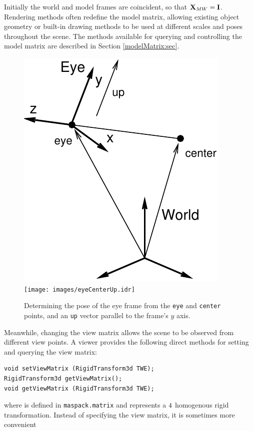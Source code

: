 Initially the world and model frames are coincident, so that ${\bf X}_{MW}
= {\bf I}$. Rendering methods often redefine the model matrix, allowing
existing object geometry or built-in drawing methods to be used at
different scales and poses throughout the scene.  The methods
available for querying and controlling the model matrix are described
in Section \ref{modelMatrix:sec}.

%
\begin{figure}[t]
\begin{center}
\iflatexml
 \includegraphics[]{images/eyeCenterUp}
\else
 \texttt{[image: images/eyeCenterUp.idr]}
\fi
\end{center}
\caption{Determining the pose of the eye frame from the {\tt eye} and
{\tt center} points, and an {\tt up} vector parallel to the frame's
$y$ axis.}
\label{eyeCenterUp:fig}
\end{figure}
%
Meanwhile, changing the view matrix allows the scene to be
observed from different view points. A viewer provides the following
direct methods for setting and querying the view matrix:
%
\begin{lstlisting}[]
void setViewMatrix (RigidTransform3d TWE);
RigidTransform3d getViewMatrix();
void getViewMatrix (RigidTransform3d TWE);
\end{lstlisting}
%
where 
 is defined
in {\tt maspack.matrix} and represents a $4 \time 4$ homogenous
rigid transformation.
Instead of specifying the view matrix, it is sometimes more convenient
